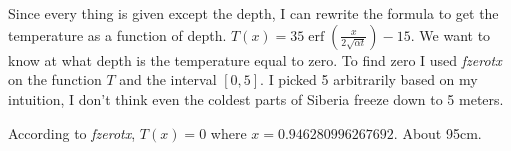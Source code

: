 \documentclass[12pt]{article}
\DeclareMathOperator{\erf}{erf}
\begin{document}
\section{}

Since every thing is given except the depth, I can rewrite the formula to get the temperature as a function of depth. 
$T(x) = 35\erf(\frac{x}{2\sqrt{\alpha t}}) - 15$. We want to know at what depth is the temperature equal to zero. To find zero I used \textit{fzerotx} on the function $T$ and the interval $[0, 5]$. I picked 5 arbitrarily based on my intuition, I don't think even the coldest parts of Siberia freeze down to 5 meters.

According to \textit{fzerotx}, $T(x) = 0$ where $x = 0.946280996267692$. About 95cm.
\end{document}
